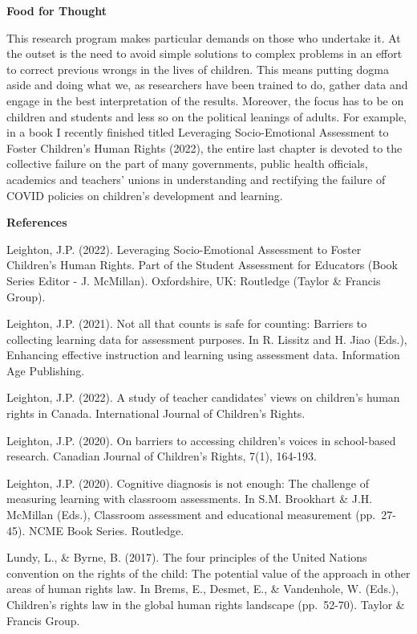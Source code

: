 \documentclass[
]{book}
\begin{document}
\textbf{Food for Thought}

This research program makes particular demands on those who undertake it. At the outset is the need to avoid simple solutions to complex problems in an effort to correct previous wrongs in the lives of children. This means putting dogma aside and doing what we, as researchers have been trained to do, gather data and engage in the best interpretation of the results. Moreover, the focus has to be on children and students and less so on the political leanings of adults. For example, in a book I recently finished titled Leveraging Socio-Emotional Assessment to Foster Children's Human Rights (2022), the entire last chapter is devoted to the collective failure on the part of many governments, public health officials, academics and teachers' unions in understanding and rectifying the failure of COVID policies on children's development and learning.

\textbf{References}

Leighton, J.P. (2022). Leveraging Socio-Emotional Assessment to Foster Children's Human Rights. Part of the Student Assessment for Educators (Book Series Editor - J. McMillan). Oxfordshire, UK: Routledge (Taylor \& Francis Group).

Leighton, J.P. (2021). Not all that counts is safe for counting: Barriers to collecting learning data for assessment purposes. In R. Lissitz and H. Jiao (Eds.), Enhancing effective instruction and learning using assessment data. Information Age Publishing.

Leighton, J.P. (2022). A study of teacher candidates' views on children's human rights in Canada. International Journal of Children's Rights.

Leighton, J.P. (2020). On barriers to accessing children's voices in school-based research. Canadian Journal of Children's Rights, 7(1), 164-193.

Leighton, J.P. (2020). Cognitive diagnosis is not enough: The challenge of measuring learning with classroom assessments. In S.M. Brookhart \& J.H. McMillan (Eds.), Classroom assessment and educational measurement (pp.~27-45). NCME Book Series. Routledge.

Lundy, L., \& Byrne, B. (2017). The four principles of the United Nations convention on the rights of the child: The potential value of the approach in other areas of human rights law. In Brems, E., Desmet, E., \& Vandenhole, W. (Eds.), Children's rights law in the global human rights landscape (pp.~52-70). Taylor \& Francis Group.
\end{document}

